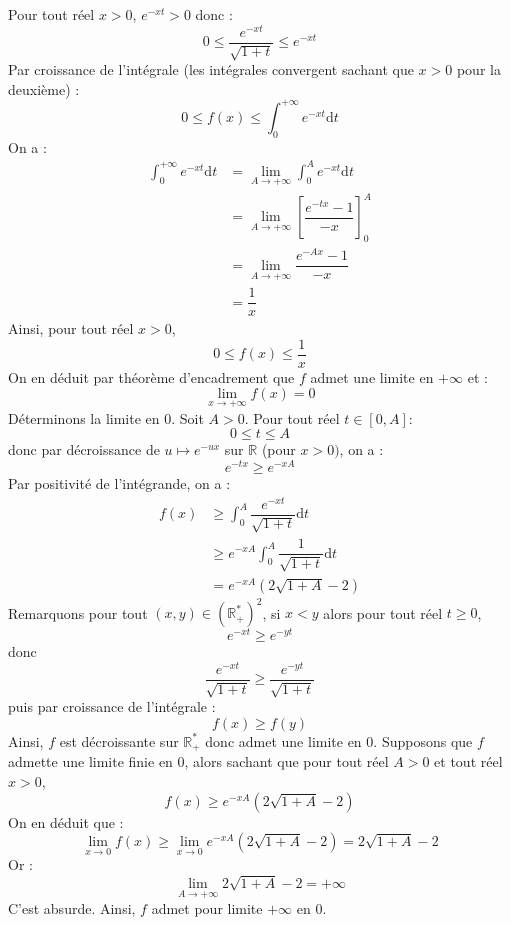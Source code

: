 \documentclass[a4paper,twoside,french,11pt]{VcCours}
\newcommand{\dt}{\text{d}t}
\begin{document}
\begin{enumerate}
Pour tout réel $x>0$, $e^{-xt} > 0$ donc :
$$  0 \leq \dfrac{e^{-xt}}{\sqrt{1+t}} \leq e^{-xt}$$
Par croissance de l'intégrale (les intégrales convergent sachant que $x>0$ pour la deuxième) :
$$ 0 \leq f(x) \leq \int_0^{+ \infty} e^{-xt} \dt$$
On a :
\begin{align*}
\int_0^{+ \infty} e^{-xt} \dt & =\lim_{A \rightarrow + \infty} \int_0^{A} e^{-xt} \dt \\
& = \lim_{A \rightarrow + \infty} \left[ \dfrac{e^{-tx}-1}{-x} \right]_0^A \\
&  = \lim_{A \rightarrow + \infty} \dfrac{e^{-Ax}-1}{-x} \\
& = \dfrac{1}{x}
\end{align*}
Ainsi, pour tout réel $x>0$,
$$ 0 \leq f(x) \leq \dfrac{1}{x}$$
On en déduit par théorème d'encadrement que $f$ admet une limite en $+ \infty$ et :
$$ \lim_{x \rightarrow + \infty} f(x) = 0$$
Déterminons la limite en $0$. Soit $A >0$. Pour tout réel $t \in [0,A]$:
$$ 0 \leq t \leq A$$
donc par décroissance de $u \mapsto e^{-ux}$ sur $\mathbb{R}$ (pour $x>0)$, on a :
$$  e^{-tx} \geq  e^{-xA}$$
Par positivité de l'intégrande, on a :
\begin{align*}
 f(x) & \geq \int_0^{A} \dfrac{e^{-xt}}{\sqrt{1+t}}  \dt  \\
 & \geq e^{-xA} \int_0^A \dfrac{1}{\sqrt{1+t}}  \dt  \\ 
 & = e^{-xA} (2 \sqrt{1+A}-2) 
\end{align*}
Remarquons pour tout $(x,y) \in (\mathbb{R}_+^*)^2$, si $x<y$ alors pour tout réel $t \geq 0$,
$$ e^{-xt} \geq e^{-yt}$$
donc 
$$ \dfrac{e^{-xt}}{\sqrt{1+t}} \geq \dfrac{e^{-yt}}{\sqrt{1+t}}$$
puis par croissance de l'intégrale :
$$ f(x) \geq f(y)$$
Ainsi, $f$ est décroissante sur $\mathbb{R}_+^*$ donc admet une limite en $0$. Supposons que $f$ admette une limite finie en $0$, alors sachant que pour tout réel $A>0$ et tout réel $x>0$,
$$ f(x) \geq  e^{-xA} (2 \sqrt{1+A}-2) $$
On en déduit que :
$$ \lim_{x \rightarrow 0} f(x) \geq \lim_{x \rightarrow 0} e^{-xA} (2 \sqrt{1+A}-2) = 2 \sqrt{1+A}-2$$
Or :
$$ \lim_{A \rightarrow + \infty} 2 \sqrt{1+A}-2 = + \infty$$
C'est absurde. Ainsi, $f$ admet pour limite $+ \infty$ en $0$.
\end{enumerate}
\end{document}
